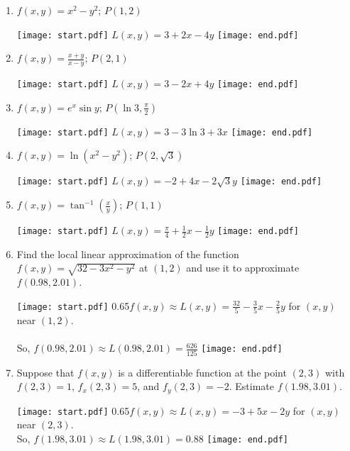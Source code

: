 \documentclass[12pt]{article}
\begin{document}
\begin{enumerate}

\item $f(x,y)=x^2-y^2$; $P(1,2)$

\texttt{[image: start.pdf]}
{{$L(x,y)=3+2x-4y$}}
\texttt{[image: end.pdf]}


\item $f(x,y)=\frac{x+y}{x-y}$; $P(2,1)$

\texttt{[image: start.pdf]}
{{$L(x,y)=3-2x+4y$}}
\texttt{[image: end.pdf]}


\item $f(x,y)=e^x\sin{y}$; $P\left(\ln3,\frac{\pi}{2}\right)$

\texttt{[image: start.pdf]}
{{$L(x,y)=3-3\ln{3}+3x$}}
\texttt{[image: end.pdf]}


\item $f(x,y)=\ln{(x^2-y^2)}$; $P\left(2,\sqrt{3}\right)$

\texttt{[image: start.pdf]}
{{$L(x,y)=-2+4x-2\sqrt{3}y$}}
\texttt{[image: end.pdf]}


\item $f(x,y)=\tan^{-1}\left(\frac{x}{y}\right)$; $P(1,1)$

\texttt{[image: start.pdf]}
{{$L(x,y)=\frac{\pi}{4}+\frac{1}{2}x-\frac{1}{2}y$}}
\texttt{[image: end.pdf]}


\item Find the local linear approximation of the function $f(x,y)=\sqrt{32-3x^2-y^2}$ at $(1,2)$ and use it to approximate $f(0.98,2.01)$. 

\texttt{[image: start.pdf]}
{{{0.65\linewidth}{$f(x,y)\approx L(x,y)=\frac{32}{5}-\frac{3}{5}x-\frac{2}{5}y$ for $(x,y)$ near $(1,2)$.\\
\\
 So, $f(0.98,2.01)\approx L(0.98,2.01)=\frac{626}{125}$}}}
\texttt{[image: end.pdf]}


\item Suppose that $f(x,y)$ is a differentiable function at the point $(2,3)$ with $f(2,3)=1$, $f_x(2,3)=5$, and $f_y(2,3)=-2$.  Estimate $f(1.98,3.01)$.

\texttt{[image: start.pdf]}
{{{0.65\linewidth}{$f(x,y)\approx L(x,y)=-3+5x-2y$ for $(x,y)$ near $(2,3)$.\\
So, $f(1.98,3.01)\approx L(1.98,3.01)=0.88$}}}
\texttt{[image: end.pdf]}



\end{enumerate}
\end{document}
